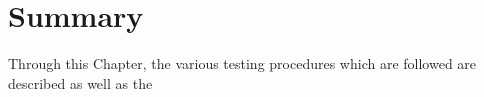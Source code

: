 \section{Summary}

Through this Chapter, the various testing procedures which are followed are described as well as the 

\clearpage
  